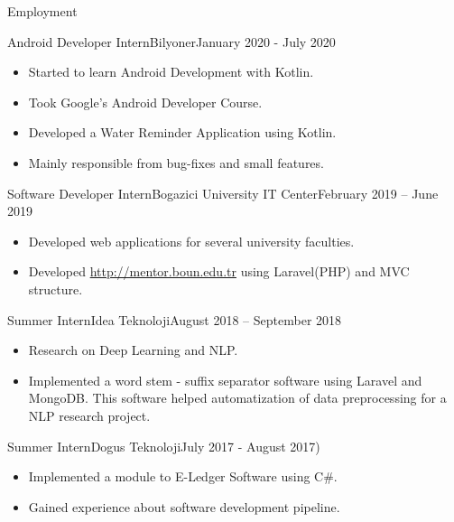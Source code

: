 \documentclass[]{mcdowellcv}
\begin{document}
\begin{cvsection}{Employment}
		\begin{cvsubsection}{Android Developer Intern}{Bilyoner}{January 2020 - July 2020}
			\begin{itemize}
				\item Started to learn Android Development with Kotlin.
				\item Took Google's Android Developer Course.
				\item Developed a Water Reminder Application using Kotlin.
				\item Mainly responsible from bug-fixes and small features.
			\end{itemize}
		\end{cvsubsection}
		
		\begin{cvsubsection}{Software Developer Intern}{Bogazici University IT Center}{February 2019 – June 2019}
			\begin{itemize}
				\item Developed web applications for several university faculties.
				\item Developed \url{http://mentor.boun.edu.tr} using Laravel(PHP) and MVC structure.
			\end{itemize}
		\end{cvsubsection}
		
		\begin{cvsubsection}{Summer Intern}{Idea Teknoloji}{August 2018 – September 2018}
			\begin{itemize}
				\item Research on Deep Learning and NLP.
				\item Implemented a word stem - suffix separator software using Laravel and MongoDB. This software helped automatization of data preprocessing for a NLP research project.
			\end{itemize}
		\end{cvsubsection}
			
		\begin{cvsubsection}{Summer Intern}{Dogus Teknoloji}{July 2017 - August 2017)}
			\begin{itemize}
				\item Implemented a module to E-Ledger Software using C\#. 
				\item Gained experience about software development pipeline.
			\end{itemize}
		\end{cvsubsection}
	\end{cvsection}
\end{document}
